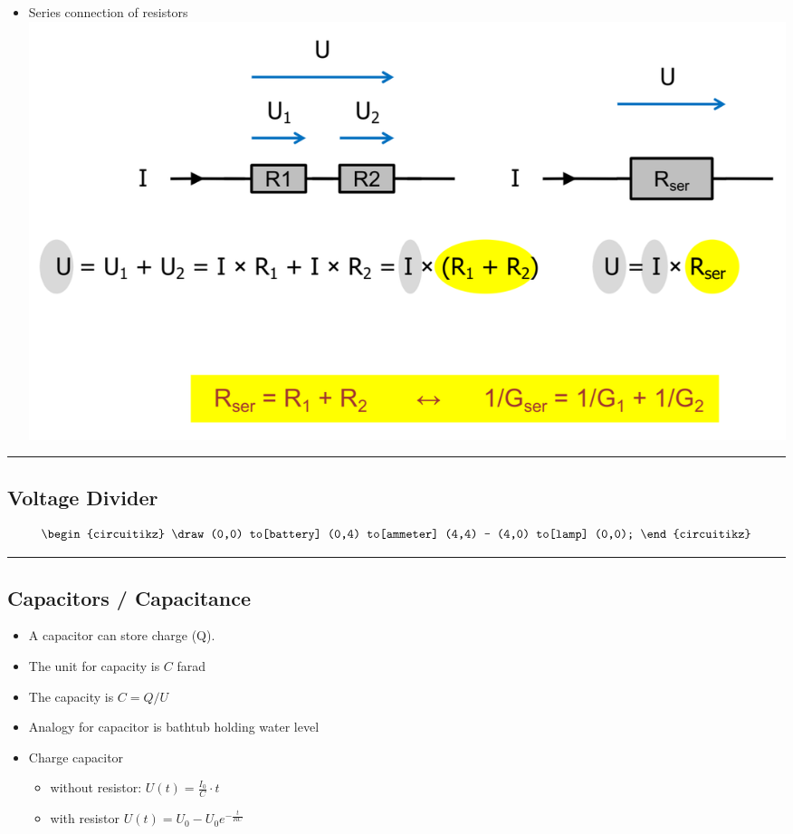 \documentclass[a4paper]{article}
\providecommand{\tightlist}{%
  \setlength{\itemsep}{0pt}\setlength{\parskip}{0pt}}
\begin{document}
\begin{multicols*}{3}
\begin{itemize}
\tightlist
\item
  Series connection of resistors
  \includegraphics{../assets/images/2022-02-06-21-32-56.png}
\end{itemize}

\begin{center}\rule{0.5\linewidth}{0.5pt}\end{center}

\hypertarget{voltage-divider}{%
\subsection{Voltage Divider}\label{voltage-divider}}

\[
\begin{circuitikz} \draw
(0,0) to[battery] (0,4)
  to[ammeter] (4,4) -- (4,0)
  to[lamp] (0,0);
\end{circuitikz}
\]

\begin{center}\rule{0.5\linewidth}{0.5pt}\end{center}

\hypertarget{capacitors-capacitance}{%
\subsection{Capacitors / Capacitance}\label{capacitors-capacitance}}

\begin{itemize}
\tightlist
\item
  A capacitor can store charge (Q).
\item
  The unit for capacity is \(C\) farad
\item
  The capacity is \(C=Q/U\)
\item
  Analogy for capacitor is bathtub holding water level
\item
  Charge capacitor

  \begin{itemize}
  \tightlist
  \item
    without resistor: \(U(t) = \frac{I_0}{C}\cdot t\)
  \item
    with resistor \(U(t) = U_0 - U_0 e^{-\frac{t}{RC}}\)
  \end{itemize}
\end{itemize}

\end{multicols*}
\end{document}

